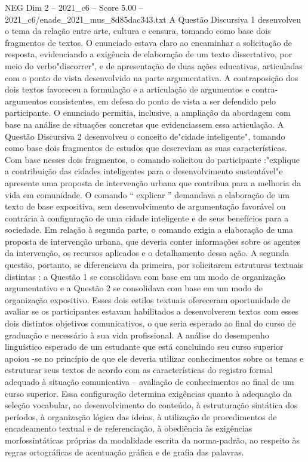 \begin{textsample}{NEG Dim 2 – 2021\_c6 – Score 5.00 – 2021\_c6/enade\_2021\_mus\_8d85dac343.txt}
A Questão Discursiva 1 desenvolveu o tema da relação entre arte, cultura e censura, tomando como base dois fragmentos de textos.
O enunciado estava claro ao encaminhar a solicitação de resposta, evidenciando a exigência de elaboração de um texto dissertativo, por meio do verbo"discorrer", e de apresentação de duas ações educativas, articuladas com o ponto de vista desenvolvido na parte argumentativa.
A contraposição dos dois textos favoreceu a formulação e a articulação de argumentos e contra-argumentos consistentes, em defesa do ponto de vista a ser defendido pelo participante.
O enunciado permitia, inclusive, a ampliação da abordagem com base na análise de situações concretas que evidenciassem essa articulação.
A Questão Discursiva 2 desenvolveu o conceito de"cidade inteligente", tomando como base dois fragmentos de estudos que descreviam as suas características.
Com base nesses dois fragmentos, o comando solicitou do participante :"explique a contribuição das cidades inteligentes para o desenvolvimento sustentável"e apresente uma proposta de intervenção urbana que contribua para a melhoria da vida em comunidade.
O comando “ explicar ” demandava a elaboração de um texto de base expositiva, sem desenvolvimento de argumentação favorável ou contrária à configuração de uma cidade inteligente e de seus benefícios para a sociedade.
Em relação à segunda parte, o comando exigia a elaboração de uma proposta de intervenção urbana, que deveria conter informações sobre os agentes da intervenção, os recursos aplicados e o detalhamento dessa ação.
A segunda questão, portanto, se diferenciava da primeira, por solicitarem estruturas textuais distintas : a Questão 1 se consolidava com base em um modo de organização argumentativo e a Questão 2 se consolidava com base em um modo de organização expositivo.
Esses dois estilos textuais ofereceram oportunidade de avaliar se os participantes estavam habilitados a desenvolverem textos com esses dois distintos objetivos comunicativos, o que seria esperado ao final do curso de graduação e necessário à sua vida profissional.
A análise do desempenho linguístico esperado de um estudante que está concluindo seu curso superior apoiou -se no princípio de que ele deveria utilizar conhecimentos sobre os temas e estruturar seus textos de acordo com as características do registro formal adequado à situação comunicativa – avaliação de conhecimentos ao final de um curso superior.
Essa configuração determina exigências quanto à adequação da seleção vocabular, ao desenvolvimento do conteúdo, à estruturação sintática dos períodos, à organização lógica das ideias, à utilização de procedimentos de encadeamento textual e de referenciação, à obediência às exigências morfossintáticas próprias da modalidade escrita da norma-padrão, ao respeito às regras ortográficas de acentuação gráfica e de grafia das palavras.

\end{textsample}
